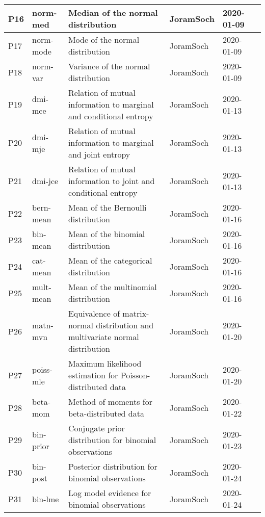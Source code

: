 \documentclass[a4paper,12pt,twoside]{book}
\begin{document}
\begin{longtable}{|p{1cm}|p{2cm}|p{6.5cm}|p{3cm}|p{2cm}|c|}
P16 & norm-med & Median of the normal distribution & JoramSoch & 2020-01-09 & \pageref{sec:norm-med} \\ \hline
P17 & norm-mode & Mode of the normal distribution & JoramSoch & 2020-01-09 & \pageref{sec:norm-mode} \\ \hline
P18 & norm-var & Variance of the normal distribution & JoramSoch & 2020-01-09 & \pageref{sec:norm-var} \\ \hline
P19 & dmi-mce & Relation of mutual information to marginal and conditional entropy & JoramSoch & 2020-01-13 & \pageref{sec:dmi-mce} \\ \hline
P20 & dmi-mje & Relation of mutual information to marginal and joint entropy & JoramSoch & 2020-01-13 & \pageref{sec:dmi-mje} \\ \hline
P21 & dmi-jce & Relation of mutual information to joint and conditional entropy & JoramSoch & 2020-01-13 & \pageref{sec:dmi-jce} \\ \hline
P22 & bern-mean & Mean of the Bernoulli distribution & JoramSoch & 2020-01-16 & \pageref{sec:bern-mean} \\ \hline
P23 & bin-mean & Mean of the binomial distribution & JoramSoch & 2020-01-16 & \pageref{sec:bin-mean} \\ \hline
P24 & cat-mean & Mean of the categorical distribution & JoramSoch & 2020-01-16 & \pageref{sec:cat-mean} \\ \hline
P25 & mult-mean & Mean of the multinomial distribution & JoramSoch & 2020-01-16 & \pageref{sec:mult-mean} \\ \hline
P26 & matn-mvn & Equivalence of matrix-normal distribution and multivariate normal distribution & JoramSoch & 2020-01-20 & \pageref{sec:matn-mvn} \\ \hline
P27 & poiss-mle & Maximum likelihood estimation for Poisson-distributed data & JoramSoch & 2020-01-20 & \pageref{sec:poiss-mle} \\ \hline
P28 & beta-mom & Method of moments for beta-distributed data & JoramSoch & 2020-01-22 & \pageref{sec:beta-mom} \\ \hline
P29 & bin-prior & Conjugate prior distribution for binomial observations & JoramSoch & 2020-01-23 & \pageref{sec:bin-prior} \\ \hline
P30 & bin-post & Posterior distribution for binomial observations & JoramSoch & 2020-01-24 & \pageref{sec:bin-post} \\ \hline
P31 & bin-lme & Log model evidence for binomial observations & JoramSoch & 2020-01-24 & \pageref{sec:bin-lme} \\ \hline

\end{longtable}
\end{document}
